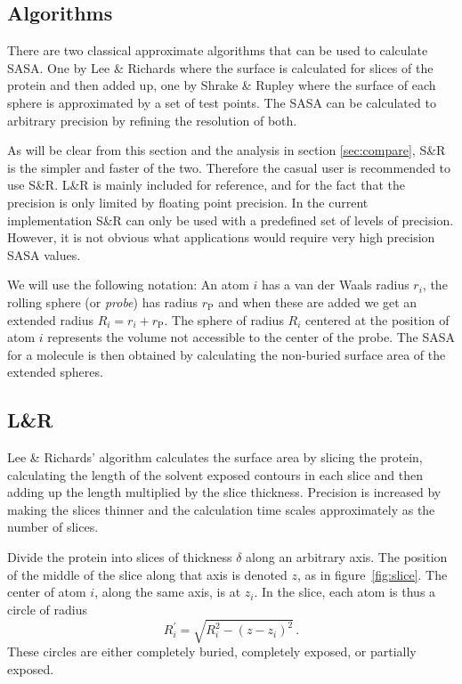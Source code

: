 \documentclass[a4paper,11pt]{article}
\begin{document}
\begin{small}

\section{Algorithms}\label{sec:alg}

There are two classical approximate algorithms that can be used to
calculate SASA. One by Lee \& Richards \cite{LnR} where the surface is
calculated for slices of the protein and then added up, one by Shrake
\& Rupley \cite{SnR} where the surface of each sphere is approximated
by a set of test points. The SASA can be calculated to arbitrary
precision by refining the resolution of both.

As will be clear from this section and the analysis in section
\ref{sec:compare}, S\&R is the simpler and faster of the
two. Therefore the casual user is recommended to use S\&R. L\&R is
mainly included for reference, and for the fact that the precision is
only limited by floating point precision. In the current
implementation S\&R can only be used with a predefined set of levels
of precision. However, it is not obvious what applications would
require very high precision SASA values.

We will use the following notation: An atom $i$ has a van der Waals
radius $r_i$, the rolling sphere (or \emph{probe}) has radius
$r_\text{P}$ and when these are added we get an extended radius $R_i =
r_i + r_\text{P}$. The sphere of radius $R_i$ centered at the position
of atom $i$ represents the volume not accessible to the center of the
probe. The SASA for a molecule is then obtained by calculating the
non-buried surface area of the extended spheres.

\subsection{L\&R} \label{sec:alg_LnR}

Lee \& Richards' algorithm calculates the surface area by slicing the
protein, calculating the length of the solvent exposed contours in
each slice and then adding up the length multiplied by the slice
thickness. Precision is increased by making the slices thinner and the
calculation time scales approximately as the number of slices.

Divide the protein into slices of thickness $\delta$ along an
arbitrary axis. The position of the middle of the slice along that
axis is denoted $z$, as in figure~\ref{fig:slice}. The center of atom
$i$, along the same axis, is at $z_i$. In the slice, each atom is thus
a circle of radius $$R_i^\prime = \sqrt{R_i^2-(z-z_i)^2}\,.$$ These
circles are either completely buried, completely exposed, or partially
exposed.


\end{small}
\end{document}
